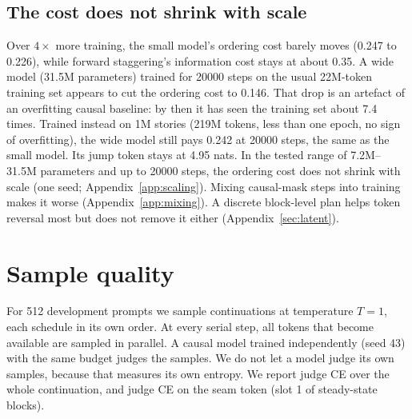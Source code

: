 \documentclass[11pt]{article}
\theoremstyle{definition}
\theoremstyle{remark}
\begin{document}
\subsection{The cost does not shrink with scale}
\label{sec:scale}

Over $4\times$ more training, the small model's ordering cost barely moves (0.247 to 0.226), while forward staggering's information cost stays at about 0.35.
A wide model (31.5M parameters) trained for 20000 steps on the usual 22M-token training set appears to cut the ordering cost to 0.146.
That drop is an artefact of an overfitting causal baseline: by then it has seen the training set about 7.4 times.
Trained instead on 1M stories (219M tokens, less than one epoch, no sign of overfitting), the wide model still pays 0.242 at 20000 steps, the same as the small model.
Its jump token stays at 4.95 nats.
In the tested range of 7.2M--31.5M parameters and up to 20000 steps, the ordering cost does not shrink with scale (one seed; Appendix~\ref{app:scaling}).
Mixing causal-mask steps into training makes it worse (Appendix~\ref{app:mixing}).
A discrete block-level plan helps token reversal most but does not remove it either (Appendix~\ref{sec:latent}).

\section{Sample quality}
\label{sec:samples}

For 512 development prompts we sample continuations at temperature $T=1$, each schedule in its own order.
At every serial step, all tokens that become available are sampled in parallel.
A causal model trained independently (seed 43) with the same budget judges the samples.
We do not let a model judge its own samples, because that measures its own entropy.
We report judge CE over the whole continuation, and judge CE on the seam token (slot 1 of steady-state blocks).
\end{document}
